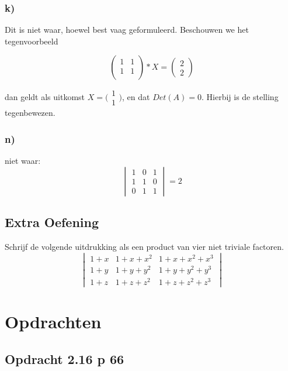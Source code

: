 \documentclass[lineaire_algebra_oplossingen.tex]{subfiles}
\begin{document}
\subsubsection*{k)}

Dit is niet waar, hoewel best vaag geformuleerd. Beschouwen we het tegenvoorbeeld

\[
\begin{pmatrix}
1 & 1\\
1 & 1\\
\end{pmatrix}
* X = 
\begin{pmatrix}
2\\
2
\end{pmatrix}
\]

dan geldt als uitkomst $X = \bigl(\begin{smallmatrix} 1\\ 1 \end{smallmatrix} \bigr)$, en dat $Det(A) = 0$. Hierbij is de stelling tegenbewezen.

\subsubsection*{n)}
niet waar:
\[
\begin{vmatrix}
1 & 0 & 1\\
1 & 1 & 0\\
0 & 1 & 1
\end{vmatrix}
=2
\]

\subsection{Extra Oefening}
Schrijf de volgende uitdrukking als een product van vier niet triviale factoren.
\[
\begin{vmatrix}
1+x & 1+x+x^{2} & 1+x+x^{2}+x^{3}\\
1+y & 1+y+y^{2} & 1+y+y^{2}+y^{3}\\
1+z & 1+z+z^{2} & 1+z+z^{2}+z^{3}
\end{vmatrix}
\]

\section{Opdrachten}

\subsection{Opdracht 2.16 p 66}
\label{2.16}
\end{document}
